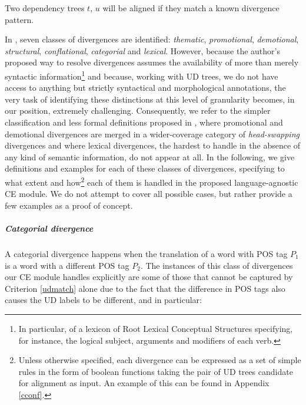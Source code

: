 \begin{criterion}
 Two dependency trees $t$, $u$ will be aligned if they match a known divergence pattern. 
\end{criterion} \smallskip

In \cite{divs}, seven classes of divergences are identified: \textit{thematic}, \textit{promotional}, \textit{demotional}, \textit{structural}, \textit{conflational}, \textit{categorial} and \textit{lexical}. 
However, because the author's proposed way to resolve divergences assumes the availability of more than merely syntactic information\footnote{In particular, of a lexicon of Root Lexical Conceptual Structures specifying, for instance, the logical subject, arguments and modifiers of each verb.} and because, working with UD trees, we do not have access to anything but strictly syntactical and morphological annotations, the very task of identifying these distinctions at this level of granularity becomes, in our position, extremely challenging. 
Consequently, we refer to the simpler classification and less formal definitions proposed in \cite{divs2}, where promotional and demotional divergences are merged in a wider-coverage category of \textit{head-swapping} divergences and where lexical divergences, the hardest to handle in the absence of any kind of semantic information, do not appear at all.
In the following, we give definitions and examples for each of these classes of divergences, specifying to what extent and how\footnote{Unless otherwise specified, each divergence can be expressed as a set of simple rules in the form of boolean functions taking the pair of UD trees candidate for alignment as input. An example of this can be found in Appendix \ref{cconf}.} each of them is handled in the proposed language-agnostic CE module. We do not attempt to cover all possible cases, but rather provide a few examples as a proof of concept.

\subparagraph*{Categorial divergence}
A categorial divergence happens when the translation of a word with POS tag $P_1$ is a word with a different POS tag $P_2$. 
The instances of this class of divergences our CE module handles explicitly are some of those that cannot be captured by Criterion \ref{udmatch} alone due to the fact that the difference in POS tags also causes the UD labels to be different, and in particular:

